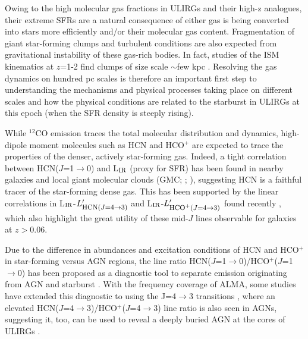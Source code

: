 \documentclass[12pt,a4paper]{article}  %
\newcommand{\comol}{$^{12}$CO\xspace}
\newcommand{\LIR}{\mbox{L$_{\rm IR}$}\xspace}
\newcommand{\rarr}{$\rightarrow$}
\newcommand{\ahcn}{HCN($J$=1\rarr0)\xspace}
\newcommand{\dhcn}{HCN($J$=4\rarr3)\xspace}
\newcommand{\hcop}{HCO$^+$\xspace}
\newcommand{\dhcop}{HCO$^+$($J$=4\rarr3)\xspace}
\newcommand{\Lp}[1][CO]{\mbox{$L^{\prime}_\textrm{\fontsize{8pt}{12pt}\selectfont{#1}}$}}
\newcommand{\Fig}[1]{Fig.~\ref{fig:#1}}
\begin{document}
Owing to the high molecular gas fractions in ULIRGs and their high-z analogues,
their extreme SFRs are a natural consequence of either gas is being converted into stars
more efficiently and/or their molecular gas content. Fragmentation
of giant star-forming clumps and turbulent conditions are also expected 
from gravitational instability of these gas-rich bodies. 
In fact, studies of the ISM kinematics at $z$=1-2 find clumps of size scale
 $\sim$few kpc \citep{Swinbank12a, Swinbank12b}. 
Resolving the gas dynamics on hundred pc scales is therefore an important first step
to understanding the mechanisms and physical processes taking
place on different scales and how the physical conditions 
are related to the starburst in ULIRGs at this epoch (when the SFR density is steeply rising).

While \comol emission traces the total molecular distribution and dynamics,
high-dipole moment molecules such as HCN and \hcop are expected to trace the 
properties of the denser, actively star-forming gas. Indeed, a tight correlation between \ahcn and \LIR 
(proxy for SFR) has been found in nearby galaxies and local giant molecular 
clouds (GMC; \citealt[hereafter GS04]{Gao04a}; \citealt{Wu05}), 
suggesting HCN is a faithful tracer of the star-forming dense gas.
This has been supported by the linear correlations in 
\LIR-\Lp[\dhcn] and \LIR-\Lp[\dhcop] found recently \citep[see \Fig{SF}]{Zhang14a}, which also highlight 
the great utility of these mid-$J$ lines observable for galaxies at $z$$>$0.06.

Due to the difference in abundances and excitation conditions of HCN and \hcop
in star-forming versus AGN regions, the line ratio \ahcn/HCO$^+$($J$=1\rarr0) has been 
proposed as a diagnostic tool to separate emission originating from AGN and starburst
\citep{Kohno05a, Imanishi10, Izumi13a}. 
With the frequency coverage of ALMA, some studies have 
extended this diagnostic to using the J=4\rarr3 transitions 
\citep{Imanishi14a, GB14a, Viti14a}, where 
an elevated \dhcn/\dhcop line ratio is also seen in AGNs, suggesting
it, too, can be used to reveal a deeply buried AGN at the cores of ULIRGs \citep{Izumi16a, Imanishi16a}.
\end{document}
